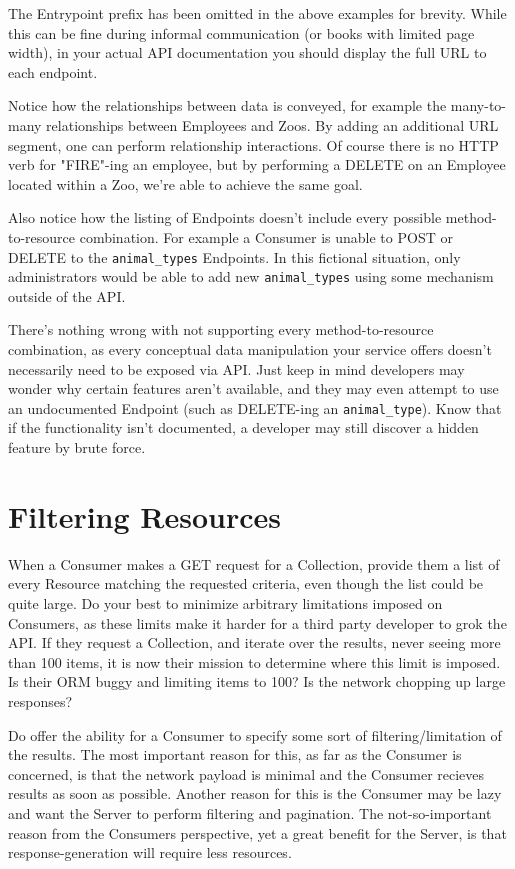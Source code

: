 \documentclass{book}
\begin{document}
The Entrypoint prefix has been omitted in the above examples for brevity. While this can be fine during informal communication (or books with limited page width), in your actual API documentation you should display the full URL to each endpoint.

Notice how the relationships between data is conveyed, for example the many-to-many relationships between Employees and Zoos. By adding an additional URL segment, one can perform relationship interactions. Of course there is no HTTP verb for "FIRE"-ing an employee, but by performing a DELETE on an Employee located within a Zoo, we're able to achieve the same goal.

Also notice how the listing of Endpoints doesn't include every possible method-to-resource combination. For example a Consumer is unable to POST or DELETE to the \texttt{animal\_types} Endpoints. In this fictional situation, only administrators would be able to add new \texttt{animal\_types} using some mechanism outside of the API.

There's nothing wrong with not supporting every method-to-resource combination, as every conceptual data manipulation your service offers doesn't necessarily need to be exposed via API. Just keep in mind developers may wonder why certain features aren't available, and they may even attempt to use an undocumented Endpoint (such as DELETE-ing an \texttt{animal\_type}). Know that if the functionality isn't documented, a developer may still discover a hidden feature by brute force.


\section{Filtering Resources}

When a Consumer makes a GET request for a Collection, provide them a list of every Resource matching the requested criteria, even though the list could be quite large. Do your best to minimize arbitrary limitations imposed on Consumers, as these limits make it harder for a third party developer to grok the API. If they request a Collection, and iterate over the results, never seeing more than 100 items, it is now their mission to determine where this limit is imposed. Is their ORM buggy and limiting items to 100? Is the network chopping up large responses?

Do offer the ability for a Consumer to specify some sort of filtering/limitation of the results. The most important reason for this, as far as the Consumer is concerned, is that the network payload is minimal and the Consumer recieves results as soon as possible. Another reason for this is the Consumer may be lazy and want the Server to perform filtering and pagination. The not-so-important reason from the Consumers perspective, yet a great benefit for the Server, is that response-generation will require less resources.
\end{document}
